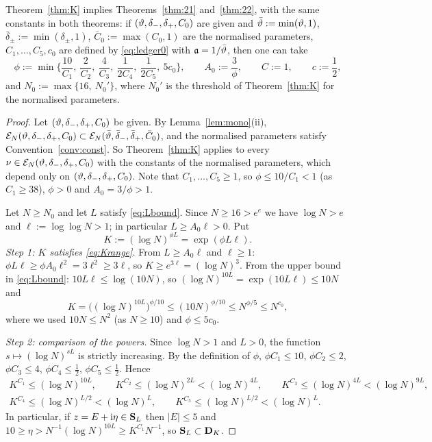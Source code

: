 \begin{proposition}[Reduction]\label{prop:reduction}
Theorem~\ref{thm:K} implies Theorems~\ref{thm:21} and~\ref{thm:22}, with the same constants in both theorems: if $(\vartheta,\delta_-,\delta_+,C_0)$ are given and
$\bar{\vartheta}:=\min(\vartheta,1)$, $\bar\delta_\pm:=\min(\delta_\pm,1)$, $\bar C_0:=\max(C_0,1)$ are the normalised parameters, $C_1,\dots,C_5,c_0$ are defined by \eqref{eq:ledger0} with $\mathfrak{a}=1/\bar{\vartheta}$, then one can take
\[
 \phi:=\min\Big\{\frac{10}{C_1},\ \frac{2}{C_2},\ \frac{4}{C_3},\ \frac1{2C_4},\ \frac1{2C_5},\ 5c_0\Big\},\qquad A_0:=\frac3\phi,\qquad C:=1,\qquad c:=\frac12,
\]
and $N_0:=\max\{16,\ N_0'\}$, where $N_0'$ is the threshold of Theorem~\ref{thm:K} for the normalised parameters.
\end{proposition}
\begin{proof}
Let $(\vartheta,\delta_-,\delta_+,C_0)$ be given. By Lemma~\ref{lem:mono}(ii), $\mathcal E_N(\vartheta,\delta_-,\delta_+,C_0)\subset\mathcal E_N(\bar{\vartheta},\bar\delta_-,\bar\delta_+,\bar C_0)$, and the normalised parameters
satisfy Convention~\ref{conv:const}. So Theorem~\ref{thm:K} applies to every $\nu\in\mathcal E_N(\vartheta,\delta_-,\delta_+,C_0)$ with the constants of the normalised parameters, which depend only on $(\vartheta,\delta_-,\delta_+,C_0)$.
Note that $C_1,\dots,C_5\ge1$, so $\phi\le10/C_1<1$ (as $C_1\ge38$), $\phi>0$ and $A_0=3/\phi>1$.

Let $N\ge N_0$ and let $L$ satisfy \eqref{eq:Lbound}. Since $N\ge16>e^e$ we have $\log N>e$ and $\ell:=\log\log N>1$; in particular $L\ge A_0\ell>0$. Put
\[
 K:=(\log N)^{\phi L}=\exp(\phi L\ell).
\]
\emph{Step 1: $K$ satisfies \eqref{eq:Krange}.} From $L\ge A_0\ell$ and $\ell\ge1$: $\phi L\ell\ge\phi A_0\ell^2=3\ell^2\ge3\ell$, so $K\ge e^{3\ell}=(\log N)^3$.
From the upper bound in \eqref{eq:Lbound}: $10L\ell\le\log(10N)$, so $(\log N)^{10L}=\exp(10L\ell)\le10N$ and
\[
 K=\big((\log N)^{10L}\big)^{\phi/10}\le(10N)^{\phi/10}\le N^{\phi/5}\le N^{c_0},
\]
where we used $10N\le N^2$ (as $N\ge10$) and $\phi\le5c_0$.

\emph{Step 2: comparison of the powers.} Since $\log N>1$ and $L>0$, the function $s\mapsto(\log N)^{sL}$ is strictly increasing. By the definition of $\phi$,
$\phi C_1\le10$, $\phi C_2\le2$, $\phi C_3\le4$, $\phi C_4\le\frac12$, $\phi C_5\le\frac12$. Hence
\begin{gather*}
 K^{C_1}\le(\log N)^{10L},\qquad K^{C_2}\le(\log N)^{2L}<(\log N)^{4L},\qquad K^{C_3}\le(\log N)^{4L}<(\log N)^{9L},\\
 K^{C_4}\le(\log N)^{L/2}<(\log N)^{L},\qquad K^{C_5}\le(\log N)^{L/2}<(\log N)^{L}.
\end{gather*}
In particular, if $z=E+\mathrm{i}\eta\in\mathbf{S}_L$ then $|E|\le5$ and $10\ge\eta>N^{-1}(\log N)^{10L}\ge K^{C_1}N^{-1}$, so $\mathbf{S}_L\subset\mathbf{D}_K$.


\end{proof}
